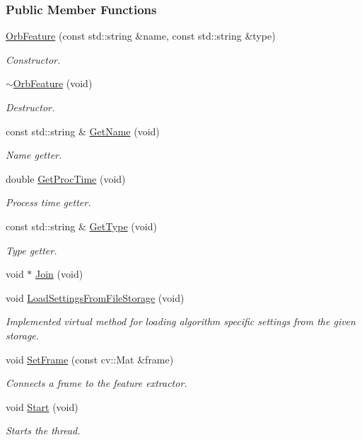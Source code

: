 \subsubsection*{Public Member Functions}
\begin{DoxyCompactItemize}
\item 
\hyperlink{group___feature_extractor_aa6033d809df476d6798cf5f78fde25f7}{Orb\-Feature} (const std\-::string \&name, const std\-::string \&type)
\begin{DoxyCompactList}\small\item\em Constructor. \end{DoxyCompactList}\item 
\hyperlink{group___feature_extractor_aed4e5d5b4410041d3c8374dbd929f2ef}{$\sim$\-Orb\-Feature} (void)
\begin{DoxyCompactList}\small\item\em Destructor. \end{DoxyCompactList}\item 
const std\-::string \& \hyperlink{group___feature_extractor_a5f69ca2455d5eec4493dbf115d00d5c9}{Get\-Name} (void)
\begin{DoxyCompactList}\small\item\em Name getter. \end{DoxyCompactList}\item 
double \hyperlink{group___feature_extractor_ad07a3104192b50d911eee634a0be009d}{Get\-Proc\-Time} (void)
\begin{DoxyCompactList}\small\item\em Process time getter. \end{DoxyCompactList}\item 
const std\-::string \& \hyperlink{group___feature_extractor_a6724c19006d495bd6a9c8c6029236ebc}{Get\-Type} (void)
\begin{DoxyCompactList}\small\item\em Type getter. \end{DoxyCompactList}\item 
void $\ast$ \hyperlink{group___core_a8f33f7750321d5df9188033e7e3e300d}{Join} (void)
\item 
void \hyperlink{group___feature_extractor_aa13ad1fbc5869dcabb55611e5c206ebd}{Load\-Settings\-From\-File\-Storage} (void)
\begin{DoxyCompactList}\small\item\em Implemented virtual method for loading algorithm specific settings from the given storage. \end{DoxyCompactList}\item 
void \hyperlink{group___feature_extractor_a3c58d995fb2440b28db3b21b54b94815}{Set\-Frame} (const cv\-::\-Mat \&frame)
\begin{DoxyCompactList}\small\item\em Connects a frame to the feature extractor. \end{DoxyCompactList}\item 
void \hyperlink{group___core_a2b42f82341afd2747ea093b6ac8b91cb}{Start} (void)
\begin{DoxyCompactList}\small\item\em Starts the thread. \end{DoxyCompactList}\end{DoxyCompactItemize}
